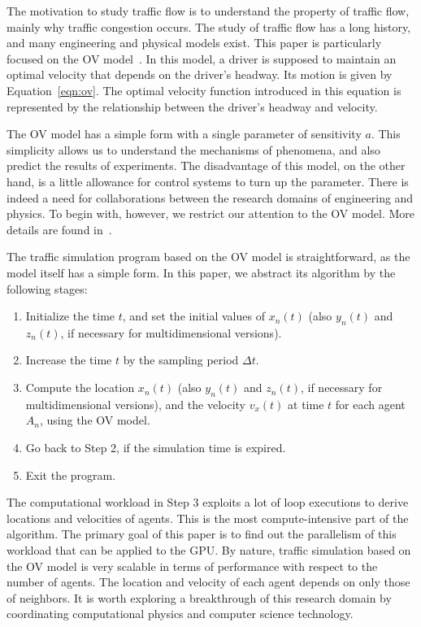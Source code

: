\documentclass[times, 10pt, twocolumn]{article}
\begin{document}
The motivation to study traffic flow is to understand the property of
traffic flow, mainly why traffic congestion occurs.
The study of traffic flow has a long history, and many engineering and
physical models exist.
This paper is particularly focused on the OV model~\cite{Bando1995,
Bando1995_2}.
In this model, a driver is supposed to maintain an optimal velocity that
depends on the driver's headway.
Its motion is given by Equation~\eqref{eqn:ov}.
The optimal velocity function introduced in this equation is represented
by the relationship between the driver's headway and velocity.

The OV model has a simple form with a single parameter of sensitivity
$a$.
This simplicity allows us to understand the mechanisms of phenomena, and
also predict the results of experiments.
The disadvantage of this model, on the other hand, is a little allowance
for control systems to turn up the parameter.
There is indeed a need for collaborations between the research domains
of engineering and physics.
To begin with, however, we restrict our attention to the OV model.
More details are found in~\cite{Bando1995, Bando1995_2}.

The traffic simulation program based on the OV model is straightforward,
as the model itself has a simple form.
In this paper, we abstract its algorithm by the following stages:

\begin{enumerate}
 \item Initialize the time $t$, and set the initial values of $x_n(t)$
       (also $y_n(t)$ and $z_n(t)$, if necessary for multidimensional
       versions).
 \item Increase the time $t$ by the sampling period $\Delta t$.
 \item Compute the location $x_n(t)$ (also $y_n(t)$ and $z_n(t)$, if
       necessary for multidimensional versions), and the velocity
       $v_x(t)$ at time $t$ for each agent $A_n$, using the OV model.
 \item Go back to Step 2, if the simulation time is expired.
 \item Exit the program.
\end{enumerate}

The computational workload in Step 3 exploits a lot of loop executions
to derive locations and velocities of agents.
This is the most compute-intensive part of the algorithm.
The primary goal of this paper is to find out the parallelism of this
workload that can be applied to the GPU.
By nature, traffic simulation based on the OV model is very scalable in
terms of performance with respect to the number of agents.
The location and velocity of each agent depends on only those of
neighbors.
It is worth exploring a breakthrough of this research domain by
coordinating computational physics and computer science technology.
\end{document}
